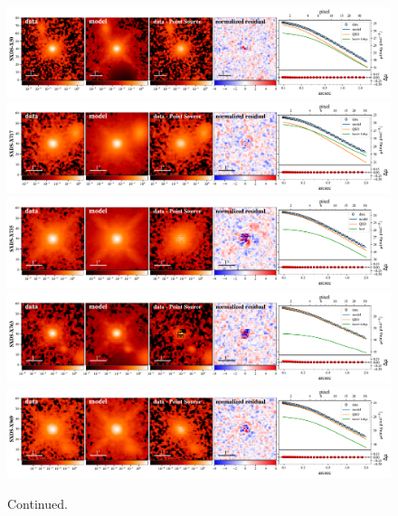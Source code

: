 \documentclass[apj]{emulateapj}
\begin{document}
\begin{figure}
\centering
{
\includegraphics[height=0.25\textwidth]{fig/best_fit_SXDS-X50_SB_profile.pdf}
\includegraphics[height=0.25\textwidth]{fig/best_fit_SXDS-X717_SB_profile.pdf}
\includegraphics[height=0.25\textwidth]{fig/best_fit_SXDS-X735_SB_profile.pdf}
\includegraphics[height=0.25\textwidth]{fig/best_fit_SXDS-X763_SB_profile.pdf}
\includegraphics[height=0.25\textwidth]{fig/best_fit_SXDS-X969_SB_profile.pdf}
}
\caption{Continued.}
\end{figure} 
\end{document}

